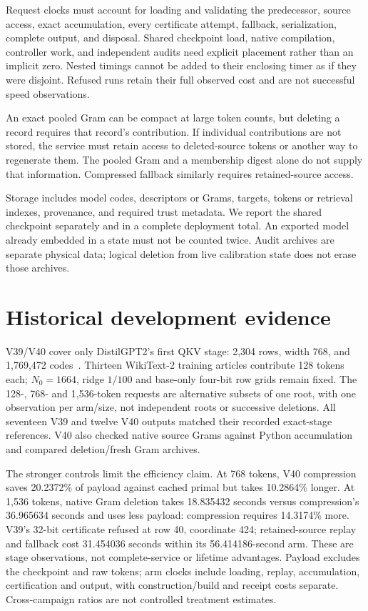 \documentclass[10pt,twocolumn,letterpaper]{article}
\begin{document}
Request clocks must account for loading and validating the predecessor, source
access, exact accumulation, every certificate attempt, fallback, serialization,
complete output, and disposal. Shared checkpoint load, native compilation,
controller work, and independent audits need explicit placement rather than an
implicit zero. Nested timings cannot be added to their enclosing timer as if they
were disjoint. Refused runs retain their full observed cost and are not successful
speed observations.

An exact pooled Gram can be compact at large token counts, but deleting a record
requires that record's contribution. If individual contributions are not stored,
the service must retain access to deleted-source tokens or another way to
regenerate them. The pooled Gram and a membership digest alone do not supply that
information. Compressed fallback similarly requires retained-source access.

Storage includes model codes, descriptors or Grams, targets, tokens or retrieval
indexes, provenance, and required trust metadata. We report the shared checkpoint
separately and in a complete deployment total. An exported model already embedded
in a state must not be counted twice. Audit archives are separate physical data;
logical deletion from live calibration state does not erase those archives.

\section{Historical development evidence}
\label{sec:history}
V39/V40 cover only DistilGPT2's first QKV stage: 2,304 rows, width 768,
and 1,769,472 codes~\cite{v39,v40}. Thirteen WikiText-2 training articles
contribute 128 tokens each; $N_0=1664$, ridge $1/100$ and base-only four-bit
row grids remain fixed. The 128-, 768- and 1,536-token requests are alternative
subsets of one root, with one observation per arm/size, not independent roots
or successive deletions. All seventeen V39 and twelve V40 outputs matched their
recorded exact-stage references. V40 also checked native source Grams against
Python accumulation and compared deletion/fresh Gram archives.

The stronger controls limit the efficiency claim. At 768 tokens, V40 compression
saves 20.2372\% of payload against cached primal but takes 10.2864\% longer.
At 1,536 tokens, native Gram deletion takes 18.835432 seconds versus compression's
36.965634 seconds and uses less payload: compression requires 14.3174\% more.
V39's 32-bit certificate refused at row 40, coordinate 424; retained-source replay
and fallback cost 31.454036 seconds within its 56.414186-second arm. These are
stage observations, not complete-service or lifetime advantages. Payload excludes
the checkpoint and raw tokens; arm clocks include loading, replay, accumulation,
certification and output, with construction/build and receipt costs separate.
Cross-campaign ratios are not controlled treatment estimates.
\end{document}
